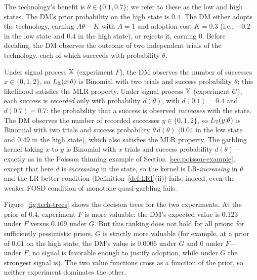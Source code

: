 The technology's benefit is $\theta \in \{0.1, 0.7\}$; we refer to
these as the low and high states. The DM's prior probability on the
high state is $0.4$. The DM either adopts the technology, earning
$A\theta - K$ with $A = 1$ and adoption cost $K = 0.3$ (i.e., $-0.2$
in the low state and $0.4$ in the high state), or rejects it, earning
$0$. Before deciding, the DM observes the outcome of two independent
trials of the technology, each of which succeeds with probability
$\theta$.

Under signal process ${\mathbb{X}}$ (experiment $F$), the DM observes the
number of successes $x \in \{0,1,2\}$, so $L_{\mathbb{X}}(x|\theta)$ is
Binomial with two trials and success probability $\theta$; this
likelihood satisfies the MLR property. Under signal process ${\mathbb{Y}}$
(experiment $G$), each success is \emph{recorded} only with
probability $d(\theta)$, with $d(0.1) = 0.4$ and $d(0.7) = 0.7$: the
probability that a success is observed \emph{increases} with the
state. The DM observes the number of recorded successes
$y \in \{0,1,2\}$, so $L_{\mathbb{Y}}(y|\theta)$ is Binomial with two trials
and success probability $\theta\, d(\theta)$ ($0.04$ in the low state
and $0.49$ in the high state), which also satisfies the MLR property.
The garbling kernel taking $x$ to $y$ is Binomial with $x$ trials and
success probability $d(\theta)$---exactly as in the Poisson thinning
example of Section~\ref{sec:poisson-example}, except that here $d$ is
\emph{increasing} in the state, so the kernel is LR-\emph{increasing}
in $\theta$ and the LR-better condition (Definition~\ref{def:LRI}(ii))
fails; indeed, even the weaker FOSD condition of monotone
quasi-garbling fails.

Figure~\ref{fig:tech-trees} shows the decision trees for the two
experiments. At the prior of $0.4$, experiment $F$ is more valuable:
the DM's expected value is $0.123$ under $F$ versus $0.109$ under $G$.
But this ranking does not hold for all priors: for sufficiently
pessimistic priors, $G$ is strictly more valuable (for example, at a
prior of $0.01$ on the high state, the DM's value is $0.0006$ under
$G$ and $0$ under $F$---under $F$, no signal is favorable enough to
justify adoption, while under $G$ the strongest signal is). The two
value functions cross as a function of the prior, so neither
experiment dominates the other. 


